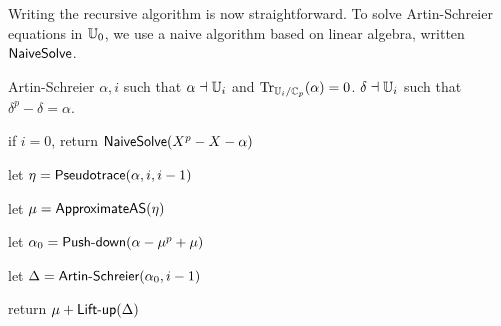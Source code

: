 
\smallskip

Writing the recursive algorithm is now straightforward. To solve
Artin-Schreier equations in $\mathbb{U}_0$, we use a naive algorithm based on
linear algebra, written ${\sf NaiveSolve}$.


\begin{algorithm}
  {Artin-Schreier}
  {$\alpha,i$ such that $\alpha\dashv\mathbb{U}_i$ and $\operatorname{Tr}_{\mathbb{U}_i/\mathbb{C}_p}(\alpha)=0$.}
  {$\delta\dashv\mathbb{U}_i$ such that $\delta^p-\delta=\alpha$.}
\item \label{alg:cou:base}if $i=0$, return ${\sf NaiveSolve}(X^p-X-\alpha)$
\item \label{alg:cou:pseudo} let $\eta = {\sf Pseudotrace}(\alpha, i,i-1)$
\item \label{alg:cou:push-beta} let $\mu= {\sf ApproximateAS}(\eta)$
\item \label{alg:cou:push-alpha} let $\alpha_0=\text{{\sf Push-down}}(\alpha-\mu^p+\mu)$
\item \label{alg:cou:rec} let $\Delta =\text{{\sf Artin-Schreier}}(\alpha_0,i-1)$
\item \label{alg:cou:lift} return $\mu+\text{{\sf Lift-up}}(\Delta)$
\end{algorithm}


